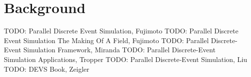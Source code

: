 \section{Background}
TODO: Parallel Discrete Event Simulation, Fujimoto \cite{fujimoto_parallel_1990} 
TODO: Parallel Discrete Event Simulation The Making Of A Field, Fujimoto \cite{fujimoto_parallel_2017}
TODO: Parallel Discrete-Event Simulation Framework, Miranda \cite{mann_parallel_2003}
TODO: Parallel Discrete-Event Simulation Applications, Tropper \cite{tropper_parallel_2002}
TODO: Parallel Discrete‐Event Simulation, Liu \cite{liu_parallel_2011}
TODO: DEVS Book, Zeigler \cite{zeigler_theory_2000}